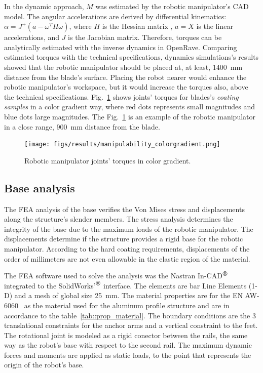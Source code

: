 In the dynamic approach, $M$ was estimated by the robotic manipulator's CAD
model. The angular accelerations are derived by differential kinematics:
$\alpha=J^+(a-\omega^TH\omega)$, where $H$ is the Hessian matrix
\cite{hourtash2005kinematic}, $a=\ddot{X}$ is the linear accelerations, and $J$
is the Jacobian matrix. Therefore, torques can be analytically estimated with
the inverse dynamics in OpenRave. Comparing estimated torques with the technical
specifications, dynamics simulations's results showed that the robotic
manipulator should be placed at, at least, 1400~mm distance from the blade's
surface. Placing the robot nearer would enhance the robotic manipulator's
workspace, but it would increase the torques also, above the technical
specifications. Fig.~\ref{fig:torques} shows joints' torques for blades's
\textit{coating samples} in a color gradient way, where red dots represents
small magnitudes and blue dots large magnitudes. The Fig.~\ref{fig:torques} is
an example of the robotic manipulator in a close range, 900~mm distance from the
blade.

\begin{figure}
	\centering
	\texttt{[image: figs/results/manipulability\_colorgradient.png]}
    \caption{Robotic manipulator joints' torques in color gradient.}
    \label{fig:torques}
\end{figure}

\subsection{Base analysis}

The FEA analysis of the base verifies the Von Mises stress and displacements
along the structure's slender members. The stress analysis determines the
integrity of the base due to the maximum loads of the robotic manipulator. The
displacements determine if the structure provides a rigid base for the robotic
manipulator. According to the hard coating requirements, displacements of the
order of millimeters are not even allowable in the elastic region of the
material.



The FEA software used to solve the analysis was the Nastran
In-CAD$^{\mbox{\small\textregistered}}$ integrated to the
SolidWorks'$^{\mbox{\small\textregistered}}$ interface. The elements are bar
Line Elements (1-D) and a mesh of global size 25~mm. The material properties are for 
the EN AW-6060~\cite{DIN_2007} as the material used for the aluminum profile
structure and are in accordance to the table~\ref{tab::prop_material}. The
boundary conditions are the 3 translational constraints for the anchor arms and
a vertical constraint to the feet. The rotational joint is modeled as a rigid
conector between the rails, the same way as the robot's base with respect to the
second rail. The maximum dynamic forces and moments \cite{MH12_manual} are
applied as static loads, to the point that represents the origin of the robot's base. 

